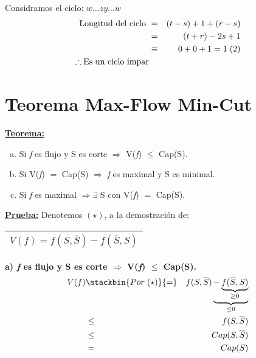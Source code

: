 \documentclass[12pt,a4paper]{report}
\begin{document}
\begin{itemize}
\begin{itemize}
						\par Considramos el ciclo: $w \dotsc z y \dotsc w$
						\begin{eqnarray}
							\nonumber \textup{Longitud del ciclo } &=& (t - s) + 1 + (r - s) \\
							\nonumber &=& (t+r) - 2s + 1 \\
							\nonumber &\equiv & 0 + 0 + 1 = 1 \; (2) \\
							\nonumber \therefore \textup{Es un ciclo impar}
						\end{eqnarray}
					\end{itemize}
			\end{itemize}


	\section{Teorema Max-Flow Min-Cut}
		\textbf{\underline{Teorema:}}
			\begin{enumerate}[a)]
				\item Si \textit{f} es flujo y S es corte $\Rightarrow$ V(\textit{f}) $\leq$ Cap(S).
				\item Si V(\textit{f}) $=$ Cap(S) $\Rightarrow$ \textit{f} es maximal y S es minimal.
				\item Si \textit{f} es maximal $\Rightarrow \exists$ S con V(\textit{f}) $=$ Cap(S).
			\end{enumerate}

		\textbf{\underline{Prueba:}} Denotemos $(\star)$, a la demostración de:
			\begin{center}
				\begin{tabular}{|c|} \hline $V(\textit{f}) = f(S, \overline{S}) - f(\overline{S},S)$ \\\hline \end{tabular}
			\end{center}

			\vspace{5mm}
			\textbf{a) \textit{f} es flujo y S es corte $\Rightarrow$ V(\textit{f}) $\leq$ Cap(S).}
				\begin{eqnarray}
					\nonumber V(f) &\stackbin{Por \; (\star)}{=}& f(S, \overline{S})\underbrace{-\underbrace{f(\overline{S}, S)}_{\geq 0}}_{\leq 0} \\
					\nonumber &\leq & f(S, \overline{S}) \\
					\nonumber &\leq & Cap(S, \overline{S}) \\
					\nonumber &=& Cap(S)
				\end{eqnarray}
\end{document}
